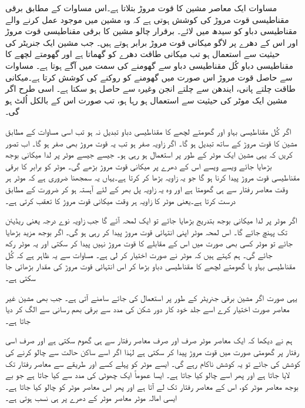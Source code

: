 مساوات   ایک معاصر مشین کا قوت مروڑ بتلاتا ہے۔اس مساوات کے مطابق برقی مقناطیسی قوت مروڑ کی کوشش ہوتی ہے کہ وہ مشین میں موجود عمل کرنے والے مقناطیسی دباو کو سیدھ میں لائے۔ برقرار  چالو  مشین کا برقی مقناطیسی قوت مروڑ اور اس کے دھرے پر لاگو میکانی قوت مروڑ برابر ہوتے ہیں۔ جب مشین ایک جنریٹر کی حیثیت سے استعمال ہو تب میکانی طاقت  دھرے کو گھماتا ہے اور گھومتے لچھے کا مقناطیسی دباو کُل مقناطیسی دباو سے گھومنے کی سمت میں آگے ہوتا ہے۔ مساوات  سے حاصل قوت مروڑ اس صورت میں گھومنے کو روکنے کی کوشش کرتا ہے۔میکانی طاقت چلتے پانی، ایندھن سے چلتے انجن وغیرہ سے حاصل ہو سکتا ہے۔ اسی طرح اگر مشین ایک موٹر کی حیثیت سے استعمال ہو رہا ہو، تب صورت اس کے بالکل اُلٹ ہو گی۔

اگر کُل مقناطیسی بہاو   اور گھومتے لچھے کا مقناطیسی دباو  تبدیل نہ ہو تب اسی مساوات کے مطابق مشین کا قوت مروڑ   کے ساتھ تبدیل ہو گا۔ اگر زاویہ  صفر ہو تب یہ قوت مروڑ بھی صفر ہو گا۔ اب  تصور کریں کہ یہی مشین ایک موٹر کے طور پر استعمال ہو رہی ہو۔ جیسے جیسے موٹر پر لدا میکانی بوجھ بڑھایا جائے ویسے ویسے اس کے دھرے پر میکانی قوت مروڑ بڑھے گی۔ موٹر کو برابر کا برقی مقناطیسی قوت مروڑ پیدا کرنا ہو گا جو یہ زاویہ بڑھا کر کرتا ہے۔یہاں یہ سمجھنا ضروری ہے کہ موٹر ہر وقت معاصر رفتار سے ہی گھومتا ہے اور وہ یہ زاویہ پل بھر کے لئے آہستہ ہو کر ضرورت کے مطابق درست کرتا ہے۔یعنی موٹر کا زاویہ  ہر وقت میکانی قوت مروڑ کا تعقب  کرتی ہے۔

اگر موٹر پر لدا میکانی بوجھ بتدریج بڑھایا جائے تو ایک لمحہ آئے گا جب زاویہ  نوے درجہ یعنی   ریڈیئن تک پہنچ جائے گا۔ اس لمحہ موٹر اپنی انتہائی قوت مروڑ  پیدا کر رہی ہو گی۔ اگر بوجھ  مزید بڑھایا جائے تو موٹر کسی بھی صورت میں اس کے مقابلے کا قوت مروڑ نہیں پیدا کر سکتی اور یہ موٹر رکھ جائے گی۔ ہم کہتے ہیں کہ موٹر نے  صورت اختیار کر لی ہے۔ مساوات سے یہ ظاہر ہے کہ کُل مقناطیسی بہاو یا گھومتے لچھے کا مقناطیسی دباو بڑھا کر اس انتہائی قوت مروڑ کی مقدار بڑھائی جا سکتی ہے۔

یہی صورت اگر مشین برقی جنریٹر کے طور پر استعمال کی جائے سامنے آتی ہے۔ جب بھی مشین غیر معاصر صورت اختیار کرے اسے جلد خود کار  دور شکن کی مدد سے برقی بھم رسانی سے الگ کر دیا جاتا ہے۔

ہم نے دیکھا کہ ایک معاصر موٹر صرف اور صرف معاصر رفتار سے ہی گھوم سکتی ہے اور صرف اسی رفتار پر گھومتی صورت میں قوت مروڑ پیدا کر سکتی ہے لہٰذا اگر اسے ساکن حالت سے چالو  کرنے کی کوشش کی جائے تو یہ کوشش ناکام رہے گی۔ ایسے موٹر کو پہلے کسے اور طریقے سے معاصر رفتار تک لایا جاتا ہے اور پھر اسے چالو کیا جاتا ہے۔ ایسا عموماً ایک چھوٹی   کی مدد سے کیا جاتا ہے جو بے بوجھ معاصر موٹر کو، اس کے معاصر رفتار تک لے آتا ہے اور پھر اس معاصر موٹر کو چالو کیا جاتا ہے۔ ایسی امالہ موٹر معاصر موٹر کے دھرے پر ہی نسب ہوتی ہے۔

